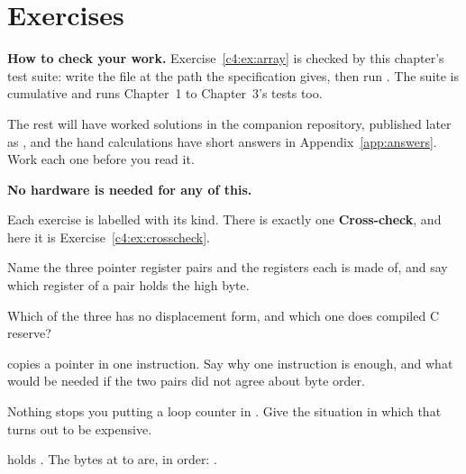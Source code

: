 
\section{Exercises}
\label{c4:sec:exercises}

\begin{aside}
\textbf{How to check your work.} Exercise~\ref{c4:ex:array} is checked by this chapter's test
suite: write the file at the path the specification gives, then run . The suite is
cumulative and runs Chapter~1 to Chapter~3's tests too.

The rest will have worked solutions in the companion repository, published later as
, and the hand calculations have short answers in
Appendix~\ref{app:answers}. Work each one before you read it.

\textbf{No hardware is needed for any of this.}
\end{aside}

Each exercise is labelled with its kind. There is exactly one \textbf{Cross-check}, and here it is
Exercise~\ref{c4:ex:crosscheck}.

\label{c4:ex:pointers}
\begin{parts}
  \item Name the three pointer register pairs and the registers each is made of, and say which
    register of a pair holds the high byte.
  \item Which of the three has no displacement form, and which one does compiled C reserve?
  \item {} copies a pointer in one instruction. Say why one instruction is enough,
    and what would be needed if the two pairs did not agree about byte order.
  \item Nothing stops you putting a loop counter in . Give the situation in which that
    turns out to be expensive.
\end{parts}

\label{c4:ex:fourways}
 holds . The bytes at  to  are, in order:
.

